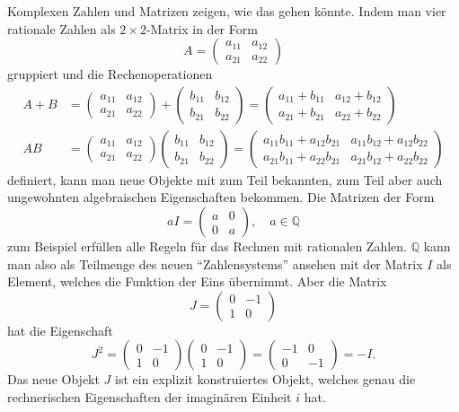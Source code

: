 Komplexen Zahlen und Matrizen zeigen, wie das gehen könnte.
%
Indem man vier rationale Zahlen als $2\times 2$-Matrix in der Form
\[
A=
\begin{pmatrix}
a_{11}&a_{12}\\
a_{21}&a_{22}
\end{pmatrix}
\]
gruppiert und die Rechenoperationen
\begin{align*}
A+B
&=
\begin{pmatrix}
a_{11}&a_{12}\\
a_{21}&a_{22}
\end{pmatrix}
+
\begin{pmatrix}
b_{11}&b_{12}\\
b_{21}&b_{22}
\end{pmatrix}
=
\begin{pmatrix}
a_{11}+b_{11}&a_{12}+b_{12}\\
a_{21}+b_{21}&a_{22}+b_{22}
\end{pmatrix}
\\
AB
&=
\begin{pmatrix}
a_{11}&a_{12}\\
a_{21}&a_{22}
\end{pmatrix}
\begin{pmatrix}
b_{11}&b_{12}\\
b_{21}&b_{22}
\end{pmatrix}
=
\begin{pmatrix}
a_{11}b_{11} + a_{12}b_{21} & a_{11}b_{12} + a_{12}b_{22} \\
a_{21}b_{11} + a_{22}b_{21} & a_{21}b_{12} + a_{22}b_{22}
\end{pmatrix}
\end{align*}
definiert, kann man neue Objekte mit zum Teil bekannten, zum Teil
aber auch ungewohnten algebraischen Eigenschaften bekommen.
Die Matrizen der Form
\[
aI
=
\begin{pmatrix} a&0\\0&a \end{pmatrix},
\quad
a\in\mathbb{Q}
\]
zum Beispiel erfüllen alle Regeln für das Rechnen mit rationalen Zahlen.
$\mathbb{Q}$ kann man also als Teilmenge des neuen ``Zahlensystems'' ansehen
mit der Matrix $I$ als Element, welches die Funktion der Eins übernimmt.
Aber die Matrix
\[
J
=
\begin{pmatrix} 0&-1\\1&0 \end{pmatrix}
\]
hat die Eigenschaft
\[
J^2 = 
\begin{pmatrix} 0&-1\\1&0 \end{pmatrix}
\begin{pmatrix} 0&-1\\1&0 \end{pmatrix}
=
\begin{pmatrix} -1&0\\0&-1\end{pmatrix}
=
-I.
\]
Das neue Objekt $J$ ist ein explizit konstruiertes Objekt, welches
genau die rechnerischen Eigenschaften der imaginären Einheit $i$ hat.

